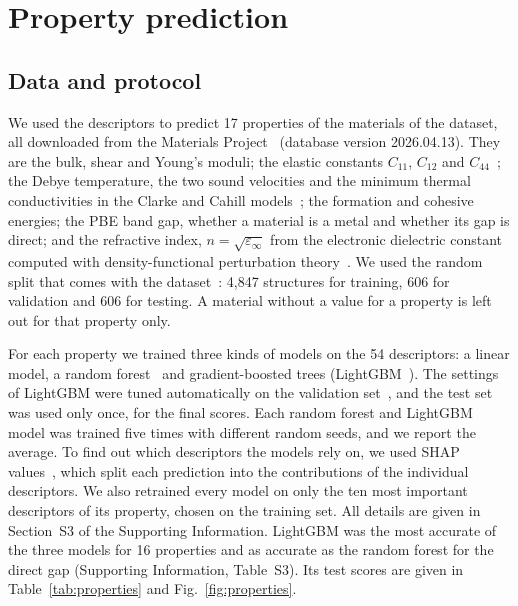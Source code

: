 \documentclass[journal=jctcce,manuscript=article,email=true]{achemso}
\newcommand{\rev}[1]{{\color{blue}#1}}
\begin{document}
\section{Property prediction}
\label{sec:properties}

\subsection{Data and protocol}
We used the descriptors to predict 17 properties of the materials of the dataset,
all downloaded from the Materials Project~\cite{jain2013}
(database version 2026.04.13). They are the bulk, shear and Young's moduli; the
elastic constants $C_{11}$, $C_{12}$ and $C_{44}$~\cite{dejong2015}; the Debye
temperature, the two sound velocities and the minimum thermal conductivities
in the Clarke and Cahill models~\cite{clarke2003,cahill1992}; the formation and
cohesive energies; the PBE band gap, whether a material is a metal and whether
its gap is direct; and the refractive index\rev{, $n=\sqrt{\varepsilon_\infty}$ from the
electronic dielectric constant computed with density-functional perturbation
theory}~\cite{petousis2017}. We used
the random split that comes with the dataset~\cite{kumar2026}: 4,847 structures
for training, 606 for validation and 606 for testing. A material without a
value for a property is left out for that property only.

For each property we trained three kinds of models on the \rev{54} descriptors: a linear model, a random forest~\rev{\cite{breiman2001,pedregosa2011}}
and gradient-boosted trees (LightGBM~\cite{ke2017}). The settings of LightGBM
were tuned automatically on the validation set~\cite{akiba2019}, and the test
set was used only once, for the final scores. Each random forest and LightGBM
model was trained five times with different random seeds, and we report the average. To find out which
descriptors the models rely on, we used SHAP values~\cite{lundberg2020}, which
split each prediction into the contributions of the individual descriptors. We
also retrained every model on only the ten most important descriptors of its
property, chosen on the training set. All details are given in
Section~S3 of the Supporting Information. LightGBM was the most accurate of the
three models for 16 properties and as accurate as the random forest for the
direct gap (Supporting Information, Table~S3). Its test scores are
given in Table~\ref{tab:properties} and Fig.~\ref{fig:properties}.
\end{document}
